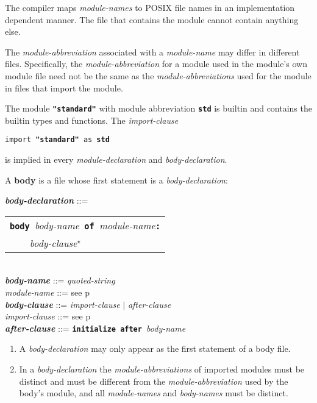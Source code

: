 \documentclass[12pt]{article}
\newcommand{\TT}[1]{{\tt \bfseries #1}}
\newcommand{\STAR}{{\Large $^\star$}}
\newcommand{\key}[1]{{\rm \bfseries #1}}
\newcommand{\ttkey}[1]{{\tt \bfseries #1}}
\newcommand{\emkey}[1]{{\em \bfseries #1}}
\newcommand{\pagref}[1]{p\pageref{#1}}
\newenvironment{indpar}[1][0.3in]%
	{\begin{list}{}%
		     {\setlength{\itemsep}{0in}%
		      \setlength{\topsep}{0in}%
		      \setlength{\parsep}{1ex}%
		      \setlength{\labelwidth}{#1}%
		      \setlength{\leftmargin}{#1}%
		      \addtolength{\leftmargin}{\labelsep}}%
	 \item}%
	{\end{list}}
\begin{document}
The compiler maps {\em module-names} to POSIX file names in an
implementation dependent manner.  The file that contains the
module cannot contain anything else.

The {\em module-abbreviation} associated with a {\em module-name}
may differ in different files.  Specifically, the {\em module-abbreviation}
for a module used in the module's own module file need not be the same
as the {\em module-abbreviations} used for the module in files
that import the module.

The module \TT{"standard"}\index{standard@\TT{"standard"}} with
module abbreviation \ttkey{std} is builtin and contains the builtin types and
functions.  The {\em import-clause}
\begin{center}
{\tt import }\TT{"standard"}{\tt{} as \ttkey{std}}
\end{center}
is implied in every {\em module-declaration} and
{\em body-declaration}.

A \key{body} is a file whose first statement is a {\em body-declaration}:

\begin{indpar}
\emkey{body-declaration}\label{BODY-DECLARATION} ::=
    \begin{tabular}[t]{l}
    \TT{body }{\em body-name}\TT{ of }{\em module-name}\TT{:} \\
    \TT{~~~~}{\em body-clause}\STAR{} \\
    \end{tabular}
\\[0.5ex]
\emkey{body-name} ::= {\em quoted-string}
\\[0.5ex]
{\em module-name} ::= see \pagref{MODULE-NAME}
\\[0.5ex]
\emkey{body-clause} ::= {\em import-clause} $|$ {\em after-clause}
\\[0.5ex]
{\em import-clause} ::= see \pagref{IMPORT-CLAUSE}
\\[0.5ex]
\emkey{after-clause} ::= \ttkey{initialize after }{\em body-name}

\begin{enumerate}

\item
A {\em body-declaration} may only appear as the first statement
of a body file.

\item
In a {\em body-declaration} the {\em module-abbreviations} of imported
modules must be distinct and must be different from the
{\em module-abbreviation} used by the body's module,
and all {\em module-names} and {\em body-names} must be distinct.
\end{enumerate}

\end{indpar}
\end{document}
